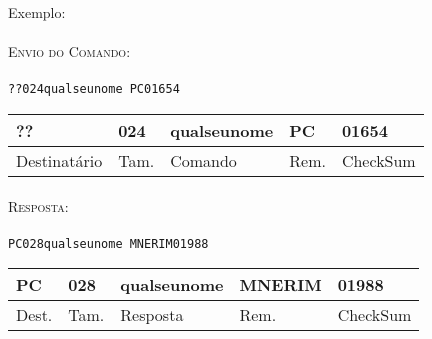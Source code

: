 \documentclass[11pt,	 papera4]{article}
\begin{document}
Exemplo:\\\\ \hspace*{0.5cm} 
\textsc{Envio do Comando:} \\\\ \hspace*{2cm} \texttt{??024qualseunome PC01654} \\

\begin{table}[h]
	\centering
	\begin{tabular}{p{2cm}p{1cm}p{2cm}p{1cm}p{2cm}}
		\toprule
		?? & 024 & qualseunome & PC & 01654 \\
		\midrule	
		Destinatário & Tam. & Comando & Rem. & CheckSum \\
		\bottomrule
	\end{tabular}
	\label{tab:formatoslatex} %
\end{table}
\paragraph*{\newline\newline}
\hspace*{0.8cm}\textsc{Resposta:} \\\\ \hspace*{2cm}\texttt{PC028qualseunome MNERIM01988} 

\begin{table}[h]
	\centering
	\begin{tabular}{p{1cm}p{1cm}p{2cm}p{2cm}p{2cm}}
		\toprule
		PC & 028 & qualseunome  & MNERIM & 01988 \\
		\midrule	
		Dest. & Tam. & Resposta & Rem. & CheckSum \\
		\bottomrule
	\end{tabular}
	\label{tab:formatoslatex} %
\end{table}





\newpage
\end{document}
